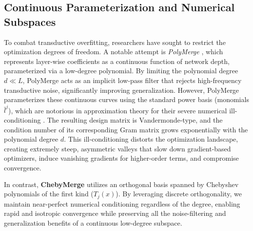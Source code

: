 \subsection{Continuous Parameterization and Numerical Subspaces}
To combat transductive overfitting, researchers have sought to restrict the optimization degrees of freedom. A notable attempt is \emph{PolyMerge} \cite{polymerge2024}, which represents layer-wise coefficients as a continuous function of network depth, parameterized via a low-degree polynomial. By limiting the polynomial degree $d \ll L$, PolyMerge acts as an implicit low-pass filter that rejects high-frequency transductive noise, significantly improving generalization.
However, PolyMerge parameterizes these continuous curves using the standard power basis (monomials $\bar{l}^j$), which are notorious in approximation theory for their severe numerical ill-conditioning \cite{gautschi1990influence}. The resulting design matrix is Vandermonde-type, and the condition number of its corresponding Gram matrix grows exponentially with the polynomial degree $d$. This ill-conditioning distorts the optimization landscape, creating extremely steep, asymmetric valleys that slow down gradient-based optimizers, induce vanishing gradients for higher-order terms, and compromise convergence.

In contrast, \textbf{ChebyMerge} utilizes an orthogonal basis spanned by Chebyshev polynomials of the first kind ($T_j(x)$). By leveraging discrete orthogonality, we maintain near-perfect numerical conditioning regardless of the degree, enabling rapid and isotropic convergence while preserving all the noise-filtering and generalization benefits of a continuous low-degree subspace.

